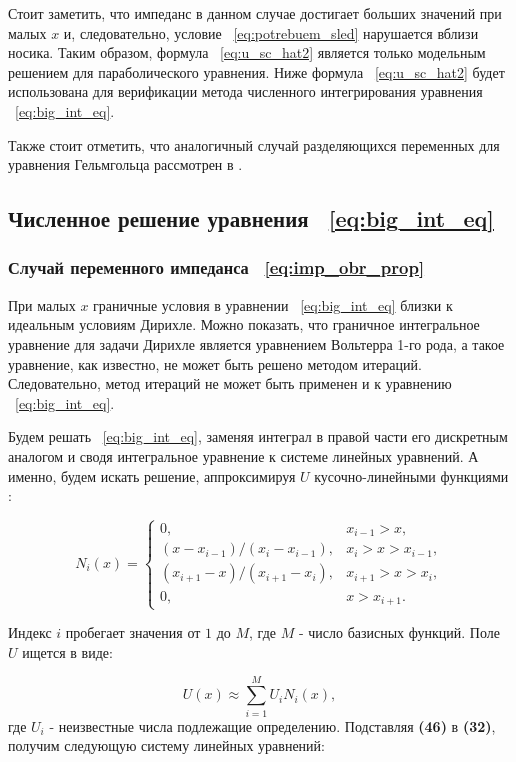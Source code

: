 Стоит заметить, что импеданс в данном случае достигает больших значений при малых $x$ и, следовательно, условие ~\eqref{eq:potrebuem_sled} нарушается вблизи носика. Таким образом, формула ~\eqref{eq:u_sc_hat2} является только модельным решением для параболического уравнения. Ниже формула ~\eqref{eq:u_sc_hat2} будет использована для верификации метода численного интегрирования уравнения ~\eqref{eq:big_int_eq}. 

Также стоит отметить, что аналогичный случай разделяющихся переменных для уравнения Гельмгольца рассмотрен в \cite{Felsen}.

\subsection{Численное решение уравнения ~\eqref{eq:big_int_eq}}

\subsubsection{Случай переменного импеданса ~\eqref{eq:imp_obr_prop}}

При малых $x$ граничные условия в уравнении ~\eqref{eq:big_int_eq} близки к идеальным условиям Дирихле. Можно показать, что граничное интегральное уравнение для задачи Дирихле является уравнением Вольтерра 1-го рода, а такое уравнение, как известно, не может быть решено методом итераций. Следовательно, метод итераций не может быть применен и к уравнению ~\eqref{eq:big_int_eq}.

Будем решать ~\eqref{eq:big_int_eq}, заменяя интеграл в правой части его дискретным аналогом и сводя интегральное уравнение к системе линейных уравнений. А именно, будем искать решение, аппроксимируя $U$ кусочно-линейными функциями \cite{Zenkevitz}:

\begin{equation}
N_i(x) = 
\begin{cases}
0, &x_{i-1} > x,\\
(x-x_{i-1})/(x_i - x_{i-1}), &x_i > x> x_{i-1},\\
(x_{i+1}-x)/(x_{i+1} - x_{i}), &x_{i+1} > x > x_{i},\\
0, &x>x_{i+1}.
\end{cases}
\end{equation}

Индекс $i$ пробегает значения от $1$ до $M$, где $M$ - число базисных функций. Поле $U$ ищется в виде:

\begin{equation}
\label{eq:eq46}
U(x) \approx \sum_{i=1}^{M} U_i N_i(x),
\end{equation}
где $U_i$ - неизвестные числа подлежащие определению. Подставляя \textbf{(46)} в \textbf{(32)}, получим следующую систему линейных уравнений:

